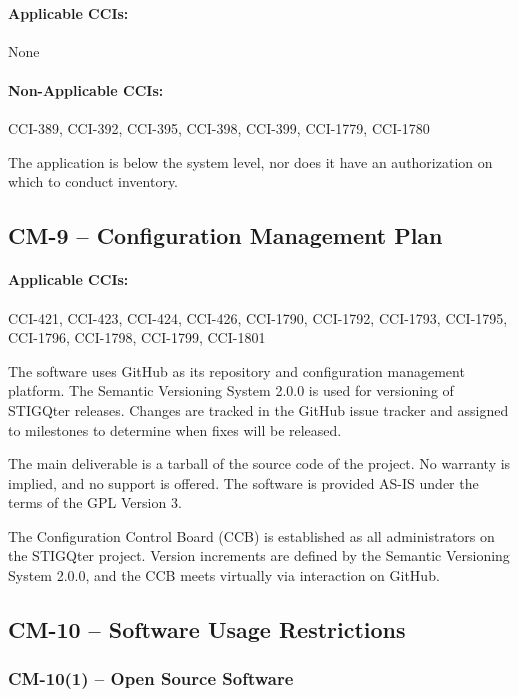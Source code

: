 \documentclass[letterpaper, 10pt, twoside]{article}
\begin{document}
\paragraph{Applicable CCIs:} None

\paragraph{Non-Applicable CCIs:} CCI-389, CCI-392, CCI-395, CCI-398, CCI-399, CCI-1779, CCI-1780

The application is below the system level, nor does it have an authorization on which to conduct inventory.

\subsection{CM-9 -- Configuration Management Plan}

\paragraph{Applicable CCIs:} CCI-421, CCI-423, CCI-424, CCI-426, CCI-1790, CCI-1792, CCI-1793, CCI-1795, CCI-1796, CCI-1798, CCI-1799, CCI-1801

The software uses GitHub as its repository and configuration management platform. The Semantic Versioning System 2.0.0 is used for versioning of STIGQter releases.\autocite{preston2013semantic} Changes are tracked in the GitHub issue tracker and assigned to milestones to determine when fixes will be released.

The main deliverable is a tarball of the source code of the project. No warranty is implied, and no support is offered. The software is provided AS-IS under the terms of the GPL Version 3.

The Configuration Control Board (CCB) is established as all administrators on the STIGQter project. Version increments are defined by the Semantic Versioning System 2.0.0, and the CCB meets virtually via interaction on GitHub.

\subsection{CM-10 -- Software Usage Restrictions}

\subsubsection{CM-10(1) -- Open Source Software}
\end{document}

